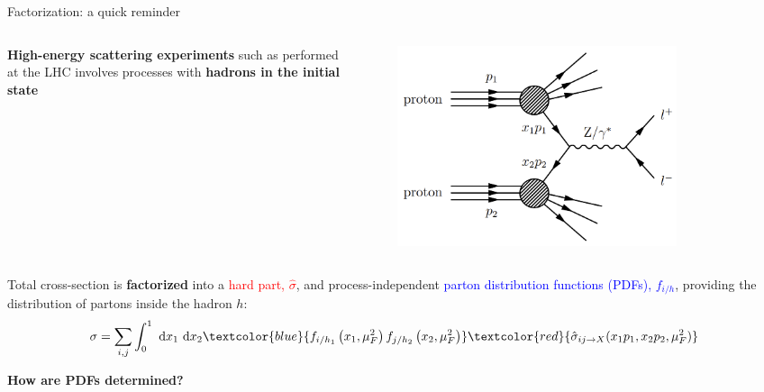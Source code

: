 \documentclass[9pt,t]{beamer}
\begin{document}
\begin{frame}{Factorization: a quick reminder}

  \begin{columns}
    \begin{column}{0.5\textwidth}
      \textbf{High-energy scattering experiments} such as performed at the LHC involves processes with \textbf{hadrons in the initial state}
    \end{column}
    \begin{column}{0.5\textwidth}
      \vspace*{-1cm}
      \begin{figure}
        \centering
        \includegraphics[width=0.8\textwidth]{figures/dy.png}
      \end{figure}
    \end{column}
  \end{columns}


  Total cross-section is \textbf{factorized} into a \textcolor{red}{hard part, $\hat{\sigma}$}, and process-independent \textcolor{blue}{parton distribution functions (PDFs), $f_{i/h}$}, providing the distribution of partons inside the hadron $h$:
  $$
    \sigma=\sum_{i, j} \int_0^1 \mathrm{~d} x_1 \mathrm{~d} x_2 \textcolor{blue}{f_{i / h_1}\left(x_1, \mu_F^2\right) f_{j / h_2}\left(x_2, \mu_F^2\right)} \textcolor{red}{\hat{\sigma}_{i j \rightarrow X }(x_1p_1, x_2p_2, \mu_F^2)}
  $$

  \vspace*{1cm}
  \begin{center}
    \textbf{How are PDFs determined?}
  \end{center}

\end{frame}
\end{document}
